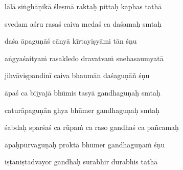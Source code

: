 lālā siṅghāṇikā śleṣmā raktaḥ pittaḥ kaphas tathā\thinspace{\dandab} \dontdisplaylinenum

svedam aśru rasaś caiva medaś ca daśamaḥ smtaḥ \veg\dontdisplaylinenum

daśa āpaguṇāś cānyā kīrtayiṣyāmi tān śṇu\thinspace{\dandab} \dontdisplaylinenum

aṅgyaśaitya\.m rasakledo dravatva\.m snehasaumyatā \veg\dontdisplaylinenum

jihvāviṣpandinī caiva bhaumān daśaguṇāñ śṇu\thinspace{\dandab} \dontdisplaylinenum


āpaś ca bījyajā bhūmis tasyā gandhaguṇaḥ smtaḥ \veg\dontdisplaylinenum

caturāpaguṇān ghya bhūmer gandhaguṇaḥ smtaḥ\thinspace{\dandab} \dontdisplaylinenum

śabdaḥ sparśaś ca rūpa\.m ca raso gandhaś ca pañcamaḥ \veg\dontdisplaylinenum

āpaḥpūrvaguṇāḥ proktā bhūmer gandhaguṇa\.m śṇu\thinspace{\dandab} \dontdisplaylinenum

iṣṭāniṣtadvayor gandhaḥ surabhir durabhis tathā \veg\dontdisplaylinenum

